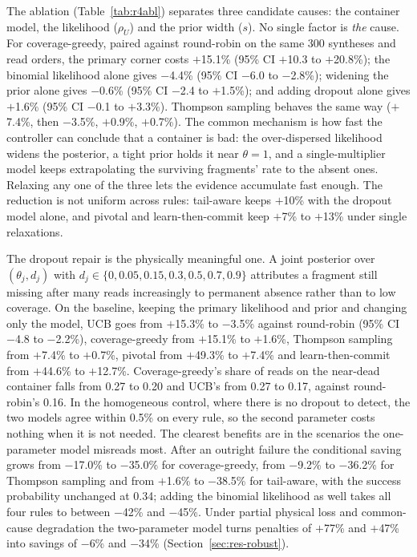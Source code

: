 \documentclass[conference,onecolumn,11pt]{IEEEtran}
\begin{document}
The ablation (Table~\ref{tab:r4abl}) separates three candidate causes: the container model, the
likelihood ($\rho_U$) and the prior width ($s$).  No single factor is \emph{the} cause.  For
coverage-greedy, paired against round-robin on the same 300 syntheses and read orders, the primary
corner costs $+$15.1\% (95\% CI $+$10.3 to $+$20.8\%); the binomial likelihood alone gives $-$4.4\% (95\% CI $-$6.0 to $-$2.8\%); widening the prior
alone gives $-$0.6\% (95\% CI $-$2.4 to $+$1.5\%); and adding dropout alone gives $+$1.6\% (95\% CI $-$0.1 to $+$3.3\%).  Thompson sampling behaves the
same way ($+$7.4\%, then $-$3.5\%, $+$0.9\%, $+$0.7\%).  The common mechanism is how fast the controller
can conclude that a container is bad: the over-dispersed likelihood widens the posterior, a tight prior
holds it near $\theta{=}1$, and a single-multiplier model keeps extrapolating the surviving fragments'
rate to the absent ones.  Relaxing any one of the three lets the evidence accumulate fast enough.  The
reduction is not uniform across rules: tail-aware keeps $+$10\% with the dropout model alone, and
pivotal and learn-then-commit keep $+$7\% to $+$13\% under single relaxations.

The dropout repair is the physically meaningful one.  A joint posterior over $(\theta_j,d_j)$ with
$d_j\in\{0,0.05,\allowbreak0.15,\allowbreak0.3,\allowbreak0.5,\allowbreak0.7,\allowbreak0.9\}$ attributes a fragment still missing after many reads increasingly
to permanent absence rather than to low coverage.  On the baseline, keeping the primary likelihood and
prior and changing only the model, UCB goes from $+$15.3\% to $-$3.5\% against round-robin (95\% CI
$-$4.8 to $-$2.2\%), coverage-greedy from $+$15.1\% to $+$1.6\%, Thompson sampling from $+$7.4\% to $+$0.7\%,
pivotal from $+$49.3\% to $+$7.4\% and learn-then-commit from $+$44.6\% to $+$12.7\%.  Coverage-greedy's
share of reads on the near-dead container falls from 0.27 to 0.20 and UCB's from 0.27 to 0.17, against
round-robin's 0.16.  In the homogeneous control, where there is no dropout to detect, the two models agree
within 0.5\% on every rule, so the second parameter costs nothing when it is not needed.  The clearest
benefits are in the scenarios the one-parameter model misreads most.  After an outright failure the
conditional saving grows from $-$17.0\% to $-$35.0\% for coverage-greedy, from $-$9.2\% to $-$36.2\% for
Thompson sampling and from $+$1.6\% to $-$38.5\% for tail-aware, with the success probability unchanged at
0.34; adding the binomial likelihood as well takes all four rules to between $-$42\% and $-$45\%.  Under
partial physical loss and common-cause degradation the two-parameter model turns penalties of $+$77\% and
$+$47\% into savings of $-$6\% and $-$34\% (Section~\ref{sec:res-robust}).
\end{document}
